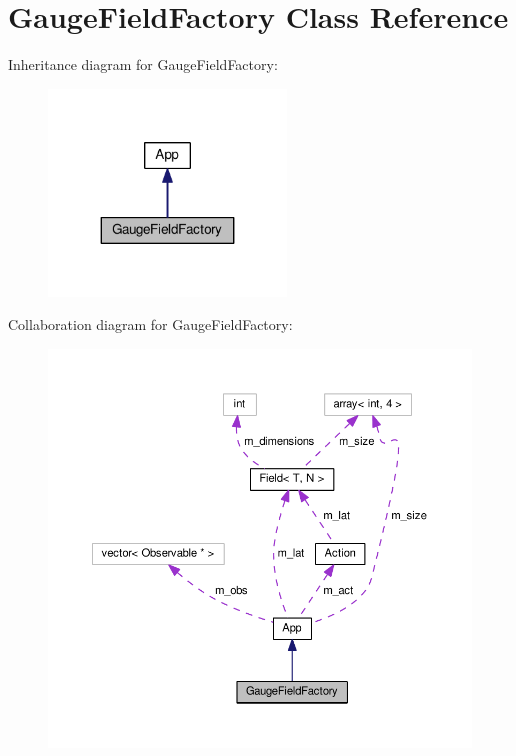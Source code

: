 \hypertarget{classGaugeFieldFactory}{}\section{Gauge\+Field\+Factory Class Reference}
\label{classGaugeFieldFactory}


Inheritance diagram for Gauge\+Field\+Factory\+:
\nopagebreak
\begin{figure}[H]
\begin{center}
\leavevmode
\includegraphics[width=179pt]{classGaugeFieldFactory__inherit__graph}
\end{center}
\end{figure}


Collaboration diagram for Gauge\+Field\+Factory\+:
\nopagebreak
\begin{figure}[H]
\begin{center}
\leavevmode
\includegraphics[width=350pt]{classGaugeFieldFactory__coll__graph}
\end{center}
\end{figure}

